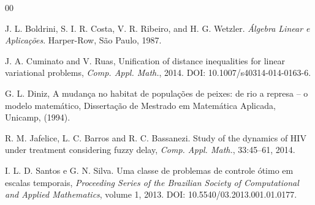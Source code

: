 \documentclass[a4]{report}
\begin{document}
\begin{thebibliography}{00}

 J. L. Boldrini, S. I. R. Costa, V. R. Ribeiro, and H. G. Wetzler. {\it Álgebra Linear 
e Aplicações}. Harper-Row, São Paulo, 1987.

J. A. Cuminato and V. Ruas, Unification of distance inequalities for linear variational problems, 
{\it Comp. Appl. Math.}, 2014. DOI: 10.1007/s40314-014-0163-6.

G. L. Diniz, A mudança no habitat de populações de peixes: de rio a represa -- o modelo matemático, Dissertação de Mestrado em Matemática Aplicada, Unicamp, (1994).

 R. M. Jafelice, L. C. Barros and R. C. Bassanezi. Study of the dynamics of HIV under 
treatment considering fuzzy delay, {\it Comp. Appl. Math.}, 33:45--61, 2014.

 I. L. D. Santos e G. N. Silva. Uma classe de problemas de controle ótimo 
em escalas temporais, {\it Proceeding Series of the Brazilian Society of Computational and 
Applied Mathematics}, volume 1, 2013. DOI: 10.5540/03.2013.001.01.0177.

\end{thebibliography}
\end{document}
